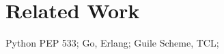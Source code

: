 \documentclass[format=sigconf, review=true, screen=true]{acmart}
\begin{document}


\section{Related Work}

Python PEP 533; Go, Erlang; Guile Scheme, TCL;
\end{document}
